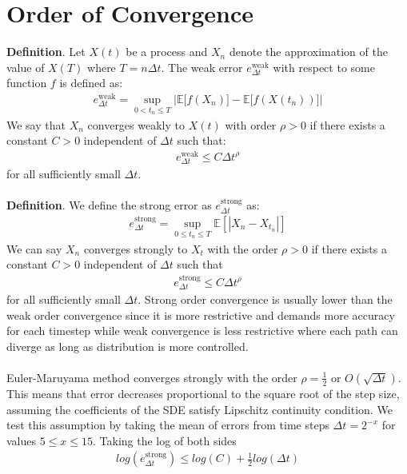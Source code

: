 \section*{Order of Convergence}
\textbf{Definition}. Let $X(t)$ be a process and $X_n$ denote the approximation of the value of $X(T)$ where $T = n\Delta t$. The weak error $e_{\Delta t}^{\text{weak}}$ with respect to some function $f$ is defined as:
\begin{align*}
e_{\Delta t}^{\text{weak}} = \sup_{0 \lt t_n \leq T} \bigg|\mathbb{E}\big[f(X_n)\big] - \mathbb{E}\big[f(X(t_n))\big] \bigg|
\end{align*}
We say that $X_n$ converges weakly to $X(t)$ with order $\rho > 0$ if there exists a constant $C > 0$ independent of  $\Delta t$ such that:
\begin{align*}
e_{\Delta t}^{\text{weak}} \le C \Delta t^{\rho}
\end{align*}
for all sufficiently small $\Delta t$.
\\
\\
\textbf{Definition}. We define the strong error as $e_{\Delta t}^{\text{strong}}$ as:
\begin{align*}
e_{\Delta t}^{\text{strong}} = \sup_{0 \le t_n \le T} \mathbb{E}\left[\left|X_n - X_{t_n}\right|\right]
\end{align*}
We can say $X_n$ converges strongly to $X_t$ with the order $\rho > 0$ if there exists a constant $C > 0$ independent of $\Delta t$ such that
\begin{align*}
e_{\Delta t}^{\text{strong}} \le C \Delta t^{\rho}
\end{align*}
for all sufficiently small $\Delta t$.
Strong order convergence is usually lower than the weak order convergence since it is more restrictive and demands more accuracy for each timestep while weak convergence is less restrictive where each path can diverge as long as distribution is more controlled.
\\
\\
Euler-Maruyama method converges strongly with the order $\rho=\frac{1}{2}$ or $O(\sqrt{\Delta t})$. This means that error decreases proportional to the square root of the step size, assuming the coefficients of the SDE satisfy Lipschitz \cite{wiki:lipschitz-continuity} continuity condition.
We test this assumption by taking the mean of errors from time steps $\Delta t=2^{-x}$ for values $5 \le x \le 15$. Taking the log of both sides
\begin{align*}
log\left(e_{\Delta t}^{\text{strong}}\right) \le log(C) + \frac{1}{2} log(\Delta t)
\end{align*}
